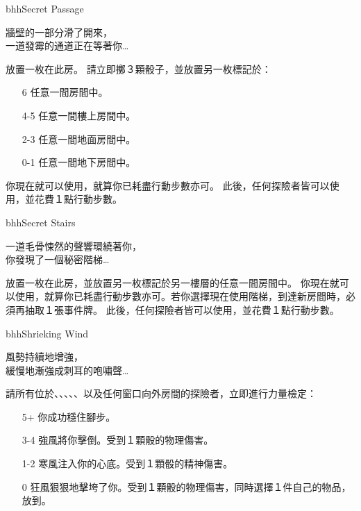 \linebreak[0]%
\begin{EventCard}{bhh}{Secret Passage}
  \begin{CardStory}
    牆壁的一部分滑了開來，\\
    一道發霉的通道正在等著你…
  \end{CardStory}
  放置一枚在此房。\smallbreak
  請立即擲３顆骰子，並放置另一枚標記於：
  \begin{itemize}
    \item[6] 任意一間房間中。
    \item[4-5] 任意一間樓上房間中。
    \item[2-3] 任意一間地面房間中。
    \item[0-1] 任意一間地下房間中。
  \end{itemize}
  你現在就可以使用，就算你已耗盡行動步數亦可。\smallbreak
  此後，任何探險者皆可以使用，並花費１點行動步數。\smallbreak
\end{EventCard}%
\linebreak[0]%
\begin{EventCard}{bhh}{Secret Stairs}
  \begin{CardStory}
    一道毛骨悚然的聲響環繞著你，\\
    你發現了一個秘密階梯…
  \end{CardStory}
  放置一枚在此房，並放置另一枚標記於另一樓層的任意一間房間中。\smallbreak
  你現在就可以使用，就算你已耗盡行動步數亦可。若你選擇現在使用階梯，到達新房間時，必須再抽取１張事件牌。\smallbreak
  此後，任何探險者皆可以使用，並花費１點行動步數。\smallbreak
\end{EventCard}%
\linebreak[0]%
\begin{EventCard}{bhh}{Shrieking Wind}
  \begin{CardStory}
    風勢持續地增強，\\
    緩慢地漸強成刺耳的咆嘯聲…
  \end{CardStory}
  請所有位於、、、、、以及任何窗口向外房間的探險者，立即進行力量檢定：
  \begin{itemize}
    \item[5+] 你成功穩住腳步。
    \item[3-4] 強風將你擊倒。受到１顆骰的物理傷害。
    \item[1-2] 寒風注入你的心底。受到１顆骰的精神傷害。
    \item[0] 狂風狠狠地擊垮了你。受到１顆骰的物理傷害，同時選擇１件自己的物品，放到。
  \end{itemize}
\end{EventCard}%
